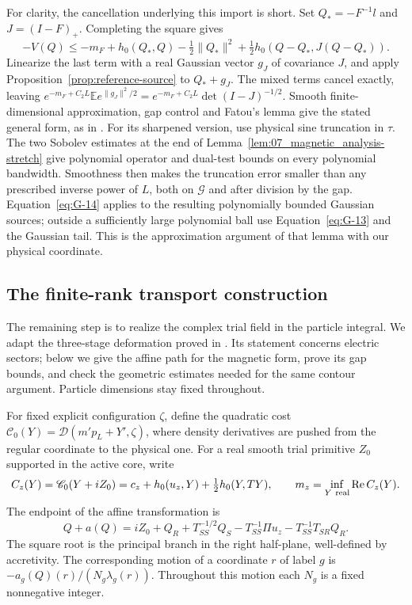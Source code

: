 For clarity, the cancellation underlying this import is short.
Set $Q_*=-F^{-1}l$ and $J=(I-F)_+$. Completing the square gives
\[
 -V(Q)\le-m_F+h_0(Q_*,Q)-\tfrac12\|Q_*\|^2
              +\tfrac12h_0(Q-Q_*,J(Q-Q_*)).
\]
Linearize the last term with a real Gaussian vector $g_J$ of covariance
$J$, and apply Proposition~\ref{prop:reference-source} to
$Q_*+g_J$. The mixed terms cancel exactly, leaving
$e^{-m_F+C_2L}\mathbb E e^{\|g_J\|^2/2}
=e^{-m_F+C_2L}\det(I-J)^{-1/2}$. Smooth finite-dimensional
approximation, gap control and Fatou's lemma give the stated general
form, as in \cite[Lemma~4.4]{Electric}. For its sharpened version,
use physical sine truncation in $\tau$. The two Sobolev estimates at
the end of Lemma~\ref{lem:07_magnetic_analysis-stretch} give polynomial
operator and dual-test bounds on every polynomial bandwidth. Smoothness
then makes the truncation error smaller than any prescribed inverse
power of $L$, both on $\mathcal G$ and after division by the gap.
Equation~\eqref{eq:G-14} applies to the resulting polynomially bounded
Gaussian sources; outside a sufficiently large polynomial ball use
Equation~\eqref{eq:G-13} and the Gaussian tail. This is the approximation
argument of that lemma with our physical coordinate.

\subsection{The finite-rank transport construction}

The remaining step is to realize the complex trial field in the
particle integral. We adapt the three-stage deformation proved in
\cite[Lemma~5.2]{Electric}. Its statement concerns electric sectors;
below we give the affine path for the magnetic form, prove its gap
bounds, and check the geometric estimates needed for the same contour
argument. Particle dimensions stay fixed throughout.

For fixed explicit configuration $\zeta$, define the quadratic cost
$\mathscr C_0(Y)=\mathcal D(m'p_L+Y',\zeta)$, where density
 derivatives are pushed from the regular coordinate to the physical one.
For a real smooth trial primitive $Z_0$ supported in the active core,
write
\[
 C_z(Y)=\mathscr C_0(Y+iZ_0)
       =c_z+h_0(u_z,Y)+\tfrac12h_0(Y,TY),\qquad
 m_z=\inf_{Y\ {\rm real}}\operatorname{Re}C_z(Y).
\]
The endpoint of the affine transformation is
\begin{equation}\label{eq:G-19}
 Q+a(Q)=iZ_0+Q_R+T_{SS}^{-1/2}Q_S
       -T_{SS}^{-1}\Pi u_z-T_{SS}^{-1}T_{SR}Q_R.
\end{equation}
The square root is the principal branch in the right half-plane,
well-defined by accretivity. The corresponding motion of a coordinate
$r$ of label $g$ is $-a_g(Q)(r)/(N_g\lambda_g(r))$.
Throughout this motion each $N_g$ is a fixed nonnegative integer.

